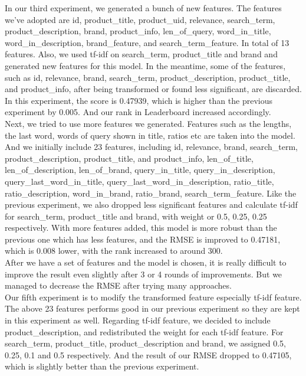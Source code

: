 \documentclass{sig-alternate-05-2015}
\begin{document}
In our third experiment, we generated a bunch of new features. The features we've adopted are  id,  product\_title, product\_uid, relevance, search\_term, product\_description, brand, product\_info, len\_of\_query, word\_in\_title, word\_in\_description, brand\_feature, and search\_term\_feature. In total of 13 features. Also, we used tf-idf on search\_term, product\_title and brand and generated new features for this model. In the meantime, some of the features, such as id, relevance, brand, search\_term, product\_description, product\_title, and product\_info, after being transformed or found less significant, are discarded. In this experiment, the score is 0.47939, which is higher than the previous experiment by 0.005. And our rank in Leaderboard increased accordingly.\\

Next, we tried to use more features we generated. Features such as the lengths, the last word, words of query shown in title, ratios etc are taken into the model. And we initially include 23 features, including id, relevance, brand, search\_term, product\_description, product\_title, and product\_info, len\_of\_title, len\_of\_description, len\_of\_brand, query\_in\_title, query\_in\_description, query\_last\_word\_in\_title, query\_last\_word\_in\_description, ratio\_title, ratio\_description, word\_in\_brand, ratio\_brand, search\_term\_feature. Like the previous experiment, we also dropped less significant features and calculate tf-idf for search\_term, product\_title and brand, with weight or 0.5, 0.25, 0.25 respectively. With more features added, this model is more robust than the previous one which has less features, and the RMSE is improved to 0.47181, which is 0.008 lower, with the rank increased to around 300.\\

After we have a set of features and the model is chosen, it is really difficult to improve the result even slightly after 3 or 4 rounds of improvements. But we managed to decrease the RMSE after trying many approaches.\\

Our fifth experiment is to modify the transformed feature especially tf-idf feature. The above 23 features performs good in our previous experiment so they are kept in this experiment as well. Regarding tf-idf feature, we decided to include product\_description, and redistributed the weight for each tf-idf feature. For search\_term, product\_title, product\_description and brand, we assigned 0.5, 0.25, 0.1 and 0.5 respectively. And the result of our RMSE dropped to 0.47105, which is slightly better than the previous experiment.
\end{document}
